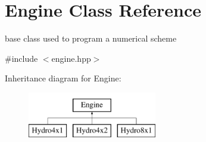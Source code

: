 \hypertarget{classEngine}{}\section{Engine Class Reference}
\label{classEngine}


base class used to program a numerical scheme  




{\ttfamily \#include $<$engine.\+hpp$>$}

Inheritance diagram for Engine\+:\begin{figure}[H]
\begin{center}
\leavevmode
\includegraphics[height=2.000000cm]{classEngine}
\end{center}
\end{figure}
